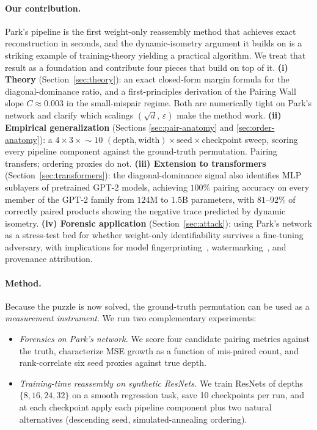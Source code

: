 \documentclass[10pt]{article}
\theoremstyle{remark}
\begin{document}
\paragraph{Our contribution.} Park's pipeline is the first
weight-only reassembly method that achieves exact reconstruction in
seconds, and the dynamic-isometry argument it builds on is a striking
example of training-theory yielding a practical algorithm. We treat that
result as a foundation and contribute four pieces that build on top of
it. \textbf{(i) Theory} (Section~\ref{sec:theory}): an exact closed-form
margin formula for the diagonal-dominance ratio, and a first-principles
derivation of the Pairing Wall slope $C\approx 0.003$ in the
small-mispair regime. Both are numerically tight on Park's network and
clarify which scalings $(\sqrt{d},\,\varepsilon)$ make the method work.
\textbf{(ii) Empirical generalization} (Sections \ref{sec:pair-anatomy}
and \ref{sec:order-anatomy}): a $4\!\times\!3\!\times\!{\sim}10$
$(\text{depth},\text{width})\times\text{seed}\times\text{checkpoint}$
sweep, scoring every pipeline component against the ground-truth
permutation. Pairing transfers; ordering proxies do not.
\textbf{(iii) Extension to transformers} (Section~\ref{sec:transformers}):
the diagonal-dominance signal also identifies MLP sublayers of
pretrained GPT-2 models, achieving $100\%$ pairing accuracy on every
member of the GPT-2 family from $124$M to $1.5$B parameters, with
$81$--$92\%$ of correctly paired products showing the negative trace
predicted by dynamic isometry.
\textbf{(iv) Forensic application} (Section~\ref{sec:attack}): using
Park's network as a stress-test bed for whether weight-only
identifiability survives a fine-tuning adversary, with implications
for model fingerprinting~\cite{lukas2022deep},
watermarking~\cite{adi2018turning}, and provenance attribution.

\paragraph{Method.} Because the puzzle is now solved, the ground-truth
permutation can be used as a \emph{measurement instrument}. We run two
complementary experiments:
\begin{itemize}[leftmargin=*,itemsep=0pt]
  \item \emph{Forensics on Park's network.} We score four candidate
        pairing metrics against the truth, characterize MSE growth as a
        function of mis-paired count, and rank-correlate six seed
        proxies against true depth.
  \item \emph{Training-time reassembly on synthetic ResNets.} We train
        ResNets of depths $\{8, 16, 24, 32\}$ on a smooth regression
        task, save 10 checkpoints per run, and at each checkpoint apply
        each pipeline component plus two natural alternatives
        (descending seed, simulated-annealing ordering).
\end{itemize}
\end{document}
